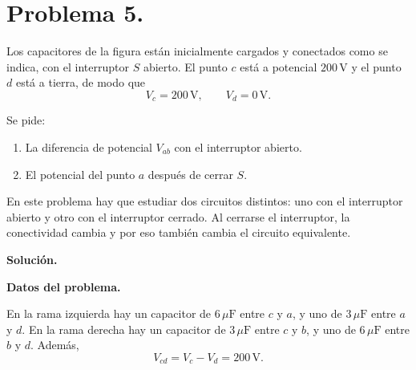 \documentclass[11pt]{article}
\newcommand{\soluciontitulo}{%
  \par\medskip
  \noindent\textbf{Solución.}\par
  \smallskip
}
\begin{document}
\newpage

\section*{Problema 5.}
Los capacitores de la figura est\'an inicialmente cargados y conectados como se indica, con el interruptor $S$ abierto. El punto $c$ est\'a a potencial $200\,\text{V}$ y el punto $d$ est\'a a tierra, de modo que
\begin{equation*}
    V_c=200\,\text{V},
    \qquad
    V_d=0\,\text{V}.
\end{equation*}

Se pide:
\begin{enumerate}[label=(\alph*)]
    \item La diferencia de potencial $V_{ab}$ con el interruptor abierto.
    \item El potencial del punto $a$ despu\'es de cerrar $S$.
\end{enumerate}

\par\medskip\noindent En este problema hay que estudiar dos circuitos distintos: uno con el interruptor abierto y otro con el interruptor cerrado. Al cerrarse el interruptor, la conectividad cambia y por eso tambi\'en cambia el circuito equivalente.\par\medskip 


\soluciontitulo

\textbf{Datos del problema.}

En la rama izquierda hay un capacitor de $6\,\mu\text{F}$ entre $c$ y $a$, y uno de $3\,\mu\text{F}$ entre $a$ y $d$. En la rama derecha hay un capacitor de $3\,\mu\text{F}$ entre $c$ y $b$, y uno de $6\,\mu\text{F}$ entre $b$ y $d$. Adem\'as,
\begin{equation*}
    V_{cd}=V_c-V_d=200\,\text{V}.
\end{equation*}
\end{document}
